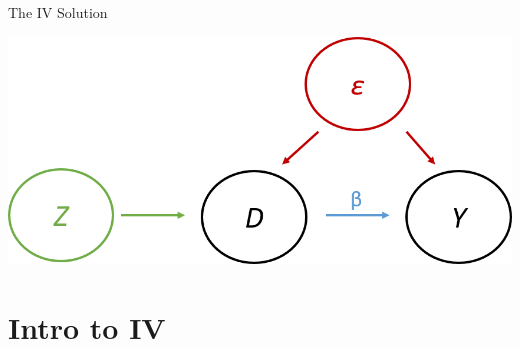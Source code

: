 \documentclass{beamer}
\begin{document}
\begin{frame}{The IV Solution}

\begin{center}
\includegraphics[scale=0.8]{./lecture_includes/dag3.png}
\end{center}

\end{frame}

\section{Intro to IV}
\end{document}
